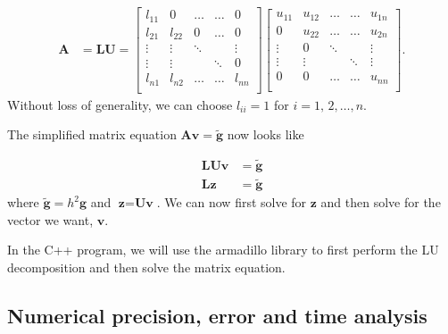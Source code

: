 \documentclass{emulateapj}
\begin{document}
        \begin{align*}
            \textbf{A} &= \textbf{L}\textbf{U} =
            \begin{bmatrix}
               l_{11} & 0      & \ldots & \ldots & 0      \\
               l_{21} & l_{22} & 0      & \ldots & 0      \\
               \vdots & \vdots & \ddots &        & \vdots \\
               \vdots & \vdots &        & \ddots & 0      \\
               l_{n1} & l_{n2} & \ldots & \ldots & l_{nn} \\
            \end{bmatrix}
            \begin{bmatrix}
               u_{11} & u_{12} & \ldots & \ldots & u_{1n} \\
               0      & u_{22} & \ldots & \ldots & u_{2n} \\
               \vdots & 0      & \ddots &        & \vdots \\
               \vdots & \vdots &        & \ddots & \vdots \\
               0      & 0      & \ldots & \ldots & u_{nn} \\
            \end{bmatrix}.
        \end{align*}
        Without loss of generality, we can choose \(l_{ii}=1\) for \(i=1,\,2,\ldots,n\). 
        
        The simplified matrix equation \(\textbf{A}\textbf{v} = \widetilde{\textbf{g}}\) now looks like
        
        \begin{align*}
            \textbf{L}\textbf{U}\textbf{v} &= \widetilde{\textbf{g}} \\
            \textbf{L}\textbf{z} &= \widetilde{\textbf{g}}
        \end{align*}
        where \(\widetilde{\textbf{g}} = h^{2}\textbf{g}\) and \(\textbf{z} = \textbf{U}\textbf{v}\). We can now first solve for \(\textbf{z}\) and then solve for the vector we want, \(\textbf{v}\).
        
        In the C++ program, we will use the armadillo library to first perform the LU decomposition and then solve the matrix equation.

    
    \subsection{Numerical precision, error and time analysis}
    \label{sec:numerical}
        
\end{document}
